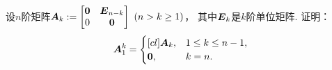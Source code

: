 \begin{example}
设\(n\)阶矩阵\(
	\boldsymbol{A}_k
	:= \begin{bmatrix}
		\boldsymbol0 & \boldsymbol{E}_{n-k} \\
		0 & \boldsymbol0
	\end{bmatrix}
	\ (n>k\geq1)
\)，
其中\(\boldsymbol{E}_k\)是\(k\)阶单位矩阵.
证明：\begin{equation*}
	\boldsymbol{A}_1^k
	= \begin{cases}[cl]
		\boldsymbol{A}_k,	& 1 \leq k \leq n-1, \\
		\boldsymbol0,			& k = n.
	\end{cases}
\end{equation*}
\end{example}
